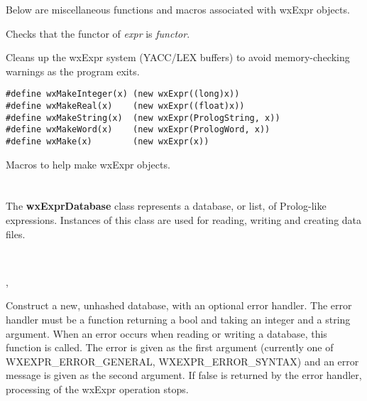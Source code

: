 
Below are miscellaneous functions and macros associated with wxExpr objects.


Checks that the functor of {\it expr} is {\it functor}.


Cleans up the wxExpr system (YACC/LEX buffers) to avoid memory-checking warnings as the program exits.

\begin{verbatim}
#define wxMakeInteger(x) (new wxExpr((long)x))
#define wxMakeReal(x)    (new wxExpr((float)x))
#define wxMakeString(x)  (new wxExpr(PrologString, x))
#define wxMakeWord(x)    (new wxExpr(PrologWord, x))
#define wxMake(x)        (new wxExpr(x))
\end{verbatim}

Macros to help make wxExpr objects.

\section{}\label{wxexprdatabase}

The {\bf wxExprDatabase} class represents a database, or list,
of Prolog-like expressions.  Instances of this class are used for reading,
writing and creating data files.


\\


, 


\label{wxexprdatabaseconstr}


Construct a new, unhashed database, with an optional error handler. The
error handler must be a function returning a bool and taking an integer and a string
argument. When an error occurs when reading or writing a database, this function is
called. The error is given as the first argument (currently one of WXEXPR\_ERROR\_GENERAL,
WXEXPR\_ERROR\_SYNTAX) and an error message is given as the second argument. If false
is returned by the error handler, processing of the wxExpr operation stops.

